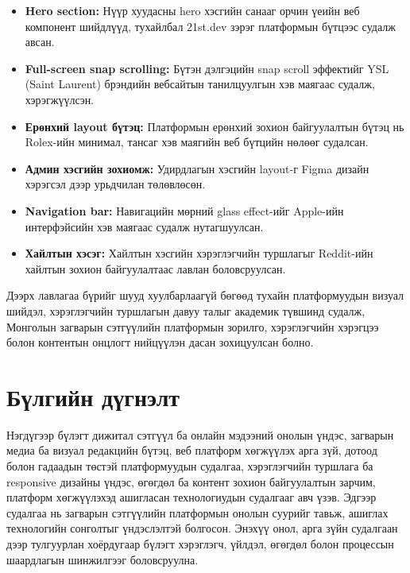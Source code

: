 \begin{itemize}
    \item \textbf{Hero section:} Нүүр хуудасны hero хэсгийн санааг орчин үеийн веб компонент шийдлүүд, тухайлбал 21st.dev зэрэг платформын бүтцээс судалж авсан.
    \item \textbf{Full-screen snap scrolling:} Бүтэн дэлгэцийн snap scroll эффектийг YSL (Saint Laurent) брэндийн вебсайтын танилцуулгын хэв маягаас судалж, хэрэгжүүлсэн.
    \item \textbf{Ерөнхий layout бүтэц:} Платформын ерөнхий зохион байгуулалтын бүтэц нь Rolex-ийн минимал, тансаг хэв маягийн веб бүтцийн нөлөөг судалсан.
    \item \textbf{Админ хэсгийн зохиомж:} Удирдлагын хэсгийн layout-г Figma дизайн хэрэгсэл дээр урьдчилан төлөвлөсөн.
    \item \textbf{Navigation bar:} Навигацийн мөрний glass effect-ийг Apple-ийн интерфэйсийн хэв маягаас судалж нутагшуулсан.
    \item \textbf{Хайлтын хэсэг:} Хайлтын хэсгийн хэрэглэгчийн туршлагыг Reddit-ийн хайлтын зохион байгуулалтаас лавлан боловсруулсан.
\end{itemize}

Дээрх лавлагаа бүрийг шууд хуулбарлаагүй бөгөөд тухайн платформуудын визуал шийдэл, хэрэглэгчийн туршлагын давуу талыг академик түвшинд судалж, Монголын загварын сэтгүүлийн платформын зорилго, хэрэглэгчийн хэрэгцээ болон контентын онцлогт нийцүүлэн дасан зохицуулсан болно.

\section*{Бүлгийн дүгнэлт}

Нэгдүгээр бүлэгт дижитал сэтгүүл ба онлайн мэдээний онолын үндэс, загварын медиа ба визуал редакцийн бүтэц, веб платформ хөгжүүлэх арга зүй, дотоод болон гадаадын төстэй платформуудын судалгаа, хэрэглэгчийн туршлага ба responsive дизайны үндэс, өгөгдөл ба контент зохион байгуулалтын зарчим, платформ хөгжүүлэхэд ашигласан технологиудын судалгааг авч үзэв. Эдгээр судалгаа нь загварын сэтгүүлийн платформын онолын суурийг тавьж, ашиглах технологийн сонголтыг үндэслэлтэй болгосон. Энэхүү онол, арга зүйн судалгаан дээр тулгуурлан хоёрдугаар бүлэгт хэрэглэгч, үйлдэл, өгөгдөл болон процессын шаардлагын шинжилгээг боловсруулна.
